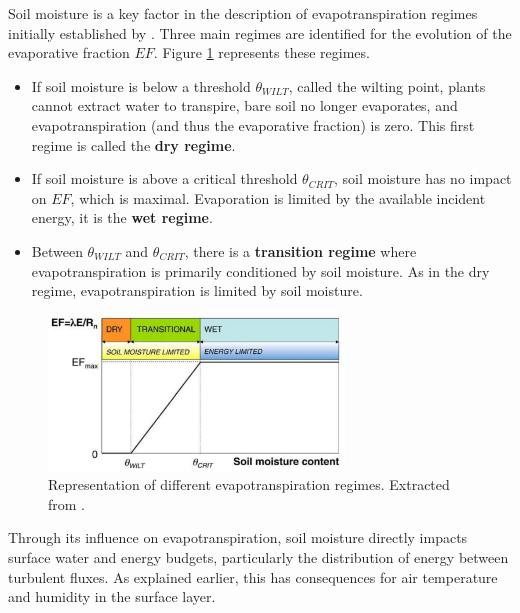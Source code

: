 Soil moisture is a key factor in the description of evapotranspiration regimes initially established by \citet{Budyko_1956, Budyko_1974}. Three main regimes are identified for the evolution of the evaporative fraction $EF$. Figure \ref{fig:evap_regimes} represents these regimes.

\begin{itemize}
    \item If soil moisture is below a threshold $\theta_{WILT}$, called the wilting point, plants cannot extract water to transpire, bare soil no longer evaporates, and evapotranspiration (and thus the evaporative fraction) is zero. This first regime is called the \textbf{dry regime}.
    \item If soil moisture is above a critical threshold $\theta_{CRIT}$, soil moisture has no impact on $EF$, which is maximal. Evaporation is limited by the available incident energy, it is the \textbf{wet regime}.
    \item Between $\theta_{WILT}$ and $\theta_{CRIT}$, there is a \textbf{transition regime} where evapotranspiration is primarily conditioned by soil moisture. As in the dry regime, evapotranspiration is limited by soil moisture.
\end{itemize}

\begin{figure}[ht]
    \centering
    \includegraphics[width=0.7\textwidth]{images/intro/evap_regimes.png}
    \caption{Representation of different evapotranspiration regimes. Extracted from \citet{seneviratne_investigating_2010}.}
    \label{fig:evap_regimes}
\end{figure}

Through its influence on evapotranspiration, soil moisture directly impacts surface water and energy budgets, particularly the distribution of energy between turbulent fluxes. As explained earlier, this has consequences for air temperature and humidity in the surface layer.

